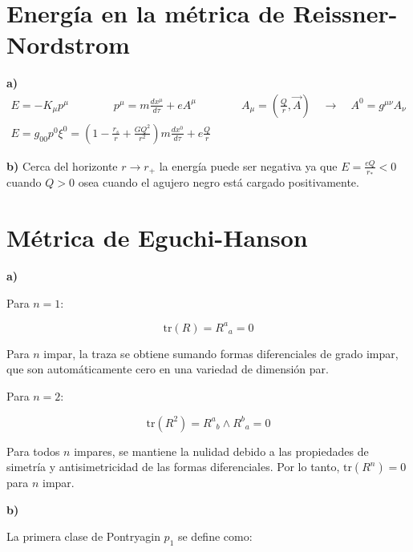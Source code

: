 \documentclass{article}
\begin{document}
\section{Energía en la métrica de Reissner-Nordstrom}

\hfill 

\textbf{a) } 
\begin{gather*}
  E = - K_\mu p ^ {\mu} \qquad \qquad p ^ {\mu} = m \frac{d x ^ {\mu} }{d \tau} + e A ^ {\mu} \qquad\qquad A_\mu = \left(\frac{Q }{r }, \vec A \right) \quad \rightarrow \quad A ^ {0 } = g ^ {\mu\nu} A _\nu \\
  E = g _{00 } p^0 \xi^0 = \left(1 - \frac{r_s }{r} + \frac{GQ^2 }{r^2 }\right) m \frac{d x^0  }{d \tau} + e \frac{Q }{r }
\end{gather*}

\hfill 

\textbf{b) } Cerca del horizonte $ r \rightarrow r_+  $ la energía puede ser negativa ya que $ E = \frac{eQ }{r_*} < 0  $ cuando $ Q > 0  $ osea cuando el agujero negro está cargado positivamente.














\section{Métrica de Eguchi-Hanson}

\hfill 


\textbf{a) }

Para \( n = 1 \):

\[
\text{tr}(R) = R^a{}_a = 0
\]

Para \( n \) impar, la traza se obtiene sumando formas diferenciales de grado impar, que son automáticamente cero en una variedad de dimensión par.

Para \( n = 2 \):

\[
\text{tr}(R^2) = R^a{}_b \wedge R^b{}_a = 0
\]

Para todos \( n \) impares, se mantiene la nulidad debido a las propiedades de simetría y antisimetricidad de las formas diferenciales. Por lo tanto, \(\text{tr}(R^n) = 0\) para \( n \) impar.

\hfill 

\textbf{b)}

La primera clase de Pontryagin \( p_1 \) se define como:
\end{document}
